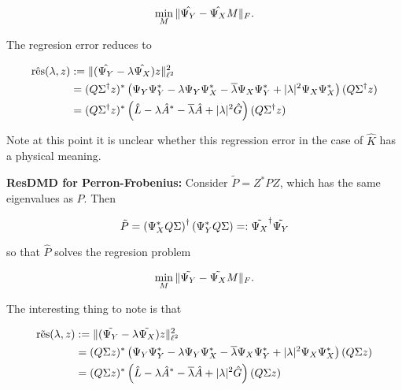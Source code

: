 \begin{equation}
    \min_M \| \hat{\Psi_Y} - \hat{\Psi_X} M \|_F . 
\end{equation}

The regresion error reduces to

\begin{align}
    \hat{\text{res}} (\lambda, z) 
    &:= \| ( \hat{\Psi_Y} - \lambda \hat{\Psi_X} ) z \|_{\ell^2}^2 \\
    &= (Q \Sigma^\dagger z)^* \left( 
        \Psi_Y \Psi_Y^* 
        - \lambda \Psi_Y \Psi_X^* 
        - \overline{\lambda} \Psi_X \Psi_Y^* 
        + | \lambda |^2 \Psi_X \Psi_X^*
    \right) (Q \Sigma^\dagger z) \\
    &= (Q \Sigma^\dagger z)^* \left( 
        \hat{L}
        - \lambda \hat{A}^*
        - \overline{\lambda} \hat{A}
        + | \lambda |^2 \hat{G}
    \right) (Q \Sigma^\dagger z)
\end{align}

Note at this point it is unclear whether this regression error in the case of $\hat{K}$ 
has a physical meaning. 

\textbf{ResDMD for Perron-Frobenius:} Consider $\tilde{P} = Z^* P Z$, which has the same 
eigenvalues as $P$. Then 

\begin{equation}
    \tilde{P} = \left( \Psi_X^* Q \Sigma \right)^\dagger \left( \Psi_Y^* Q \Sigma \right) =:
    \tilde{\Psi_X}^\dagger \tilde{\Psi_Y}
\end{equation}

so that $\hat{P}$ solves the regresion problem

\begin{equation}
    \min_M \| \tilde{\Psi_Y} - \tilde{\Psi_X} M \|_F . 
\end{equation}

The interesting thing to note is that 

\begin{align}
    \tilde{\text{res}} (\lambda, z)
    &:= \| ( \tilde{\Psi_Y} - \lambda \tilde{\Psi_X} ) z \|_{\ell^2}^2 \\
    &= (Q \Sigma z)^* \left( 
        \Psi_Y \Psi_Y^* 
        - \lambda \Psi_Y \Psi_X^* 
        - \overline{\lambda} \Psi_X \Psi_Y^* 
        + | \lambda |^2 \Psi_X \Psi_X^*
    \right) (Q \Sigma z) \\
    &= (Q \Sigma z)^* \left( 
        \hat{L}
        - \lambda \hat{A}^*
        - \overline{\lambda} \hat{A}
        + | \lambda |^2 \hat{G}
    \right) (Q \Sigma z)
\end{align}

